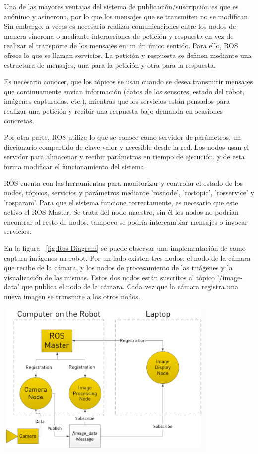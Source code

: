 Una de las mayores ventajas del sistema de publicación/suscripción es que es
anónimo y asíncrono, por lo que los mensajes que se transmiten no se modifican.
Sin embargo, a veces es necesario realizar comunicaciones entre los nodos de
manera síncrona o mediante interacciones de petición y respuesta en vez de
realizar el transporte de los mensajes en un ún único sentido. Para ello, ROS
ofrece lo que se llaman servicios. La petición y respuesta se definen mediante
una estructura de mensajes, una para la petición y otra para la respuesta.

Es necesario conocer, que los tópicos se usan cuando se desea transmitir
mensajes que continuamente envían información (datos de los sensores, estado del
robot, imágenes capturadas, etc.), mientras que los servicios están pensados
para realizar una petición y recibir una respuesta bajo demanda en ocasiones
concretas.

Por otra parte, ROS utiliza lo que se conoce como servidor de parámetros, un
diccionario compartido de clave-valor y accesible desde la red. Los nodos usan
el servidor para almacenar y recibir parámetros en tiempo de ejecución, y de
esta forma modificar el funcionamiento del sistema.

ROS cuenta con las herramientas para monitorizar y controlar el estado de los
nodos, tópicos, servicios y parámetros mediante 'rosnode', 'rostopic',
'rosservice' y 'rosparam'. Para que el sistema funcione correctamente, es
necesario que este activo el ROS Master. Se trata del nodo maestro, sin él los
nodos no podrían encontrar al resto de nodos, tampoco se podría intercambiar
mensajes o invocar servicios.

En la figura ~\ref{fig:Ros-Diagram} se puede observar una implementación de como
captura imágenes un robot. Por un lado existen tres nodos: el nodo de la cámara
que recibe de la cámara, y los nodos de procesamiento de las imágenes y la
visualización de las mismas. Estos dos nodos están suscritos al tópico
'/image-data' que publica el nodo de la cámara. Cada vez que la cámara registra
una nueva imagen se transmite a los otros nodos.

\begin{minipage}{\linewidth}
    \centering
    \includegraphics[width=0.8\textwidth]{images/cap3/RosDiagrama.eps}
    \label{fig:Ros-Diagram}
\end{minipage}


